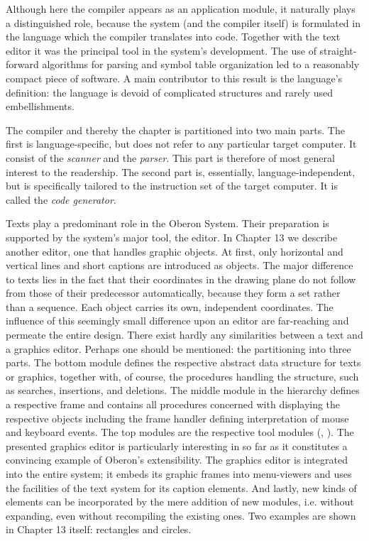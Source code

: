 Although here the compiler appears as an application module, it
naturally plays a distinguished role, because the system (and the
compiler itself) is formulated in the language which the compiler
translates into code. Together with the text editor it was the
principal tool in the system's development. The use of
straight-forward algorithms for parsing and symbol table organization
led to a reasonably compact piece of software. A main contributor to
this result is the language's definition: the language is devoid of
complicated structures and rarely used embellishments.

The compiler and thereby the chapter is partitioned into two main
parts. The first is language-specific, but does not refer to any
particular target computer. It consist of the \emph{scanner} and the
\emph{parser}. This part is therefore of most general interest to the
readership. The second part is, essentially, language-independent, but
is specifically tailored to the instruction set of the target
computer. It is called the \emph{code generator}.

Texts play a predominant role in the Oberon System. Their preparation
is supported by the system's major tool, the editor. In Chapter 13 we
describe another editor, one that handles graphic objects. At first,
only horizontal and vertical lines and short captions are introduced
as objects. The major difference to texts lies in the fact that their
coordinates in the drawing plane do not follow from those of their
predecessor automatically, because they form a set rather than a
sequence. Each object carries its own, independent coordinates. The
influence of this seemingly small difference upon an editor are
far-reaching and permeate the entire design. There exist hardly any
similarities between a text and a graphics editor. Perhaps one should
be mentioned: the partitioning into three parts. The bottom module
defines the respective abstract data structure for texts or graphics,
together with, of course, the procedures handling the structure, such
as searches, insertions, and deletions. The middle module in the
hierarchy defines a respective frame and contains all procedures
concerned with displaying the respective objects including the frame
handler defining interpretation of mouse and keyboard events. The top
modules are the respective tool modules (, ). The presented
graphics editor is particularly interesting in so far as it
constitutes a convincing example of Oberon's extensibility. The
graphics editor is integrated into the entire system; it embeds its
graphic frames into menu-viewers and uses the facilities of the text
system for its caption elements. And lastly, new kinds of elements can
be incorporated by the mere addition of new modules, i.e. without
expanding, even without recompiling the existing ones. Two examples
are shown in Chapter 13 itself: rectangles and circles.

